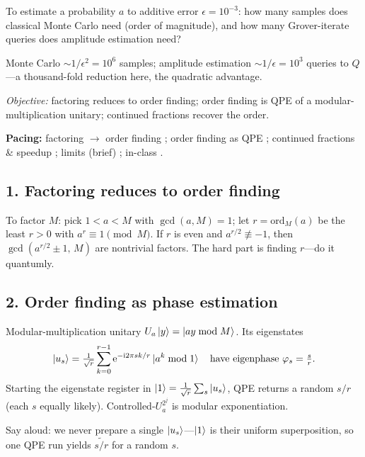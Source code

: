 \documentclass[11pt]{article}
\begin{document}
\begin{inclass}\label{ic:l5-ae}
To estimate a probability $a$ to additive error $\epsilon=10^{-3}$: how many samples does
classical Monte Carlo need (order of magnitude), and how many Grover-iterate queries does
amplitude estimation need?
\end{inclass}
\begin{answer}
Monte Carlo $\sim1/\epsilon^2=10^{6}$ samples; amplitude estimation $\sim1/\epsilon=10^{3}$
queries to $Q$---a thousand-fold reduction here, the quadratic advantage.
\end{answer}

\noindent\emph{Objective:} factoring reduces to order finding; order finding is QPE of a
modular-multiplication unitary; continued fractions recover the order.

\medskip
\noindent\textbf{Pacing:} factoring $\to$ order finding ; order finding as QPE
; continued fractions \& speedup ; limits (brief) ; in-class .

\subsection*{1. Factoring reduces to order finding }
\begin{board}
To factor $M$: pick $1<a<M$ with $\gcd(a,M)=1$; let $r=\mathrm{ord}_M(a)$ be the least
$r>0$ with $a^r\equiv1\pmod M$. If $r$ is even and $a^{r/2}\not\equiv-1$, then
$\gcd(a^{r/2}\pm1,\,M)$ are nontrivial factors. The hard part is finding $r$---do it quantumly.
\end{board}

\subsection*{2. Order finding as phase estimation }
\begin{board}
Modular-multiplication unitary $U_a\ket{y}=\ket{ay\bmod M}$. Its eigenstates
\[
  \ket{u_s}=\tfrac1{\sqrt r}\sum_{k=0}^{r-1}\mathrm{e}^{-\mathrm{i}2\pi sk/r}\ket{a^k\bmod1}
  \quad\text{have eigenphase } \varphi_s=\tfrac{s}{r}.
\]
Starting the eigenstate register in $\ket1=\tfrac1{\sqrt r}\sum_s\ket{u_s}$, QPE returns a
random $s/r$ (each $s$ equally likely). Controlled-$U_a^{2^j}$ is modular exponentiation.
\end{board}
Say aloud: we never prepare a single $\ket{u_s}$---$\ket1$ is their uniform superposition,
so one QPE run yields $\widetilde{s/r}$ for a random $s$.
\end{document}
